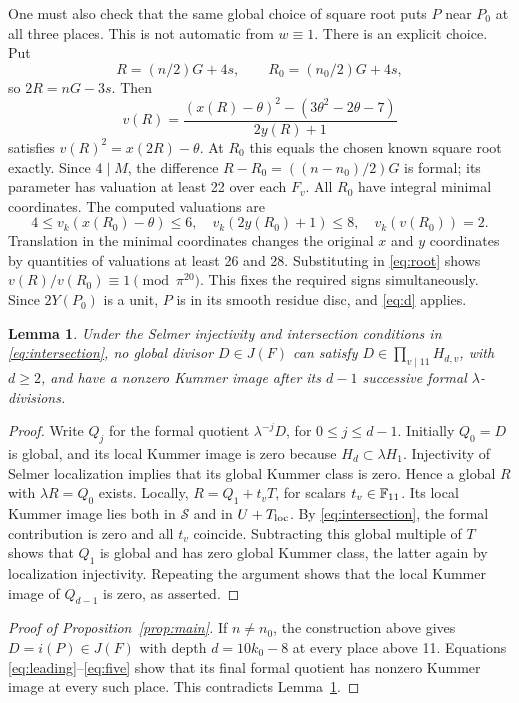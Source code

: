 \documentclass[11pt]{article}
\newtheorem{lemma}[proposition]{Lemma}
\begin{document}
One must also check that the same global choice of square root puts
\(P\) near \(P_0\) at all three places. This is not automatic from
\(w\equiv1\). There is an explicit choice. Put
\[
 R=(n/2)G+4s,\qquad R_0=(n_0/2)G+4s,
\]
so \(2R=nG-3s\). Then
\begin{equation}\label{eq:root}
 v(R)=\frac{(x(R)-\theta)^2-(3\theta^2-2\theta-7)}{2y(R)+1}
\end{equation}
satisfies \(v(R)^2=x(2R)-\theta\). At \(R_0\) this equals the chosen
known square root exactly. Since \(4\mid M\), the difference
\(R-R_0=((n-n_0)/2)G\) is formal; its parameter has valuation at least
22 over each \(F_v\). All \(R_0\) have integral minimal coordinates.
The computed valuations are
\[
 4\le v_k(x(R_0)-\theta)\le6,\quad
 v_k(2y(R_0)+1)\le8,\quad v_k(v(R_0))=2.
\]
Translation in the minimal coordinates changes the original \(x\)
and \(y\) coordinates by quantities of valuations at least 26 and 28.
Substituting in \eqref{eq:root} shows
\(v(R)/v(R_0)\equiv1\pmod{\pi^{20}}\).
This fixes the required signs simultaneously. Since \(2Y(P_0)\) is
a unit, \(P\) is in its smooth residue disc, and \eqref{eq:d} applies.

\begin{lemma}\label{lem:global}
Under the Selmer injectivity and intersection conditions in
\eqref{eq:intersection}, no global divisor \(D\in J(F)\) can satisfy
\(D\in\prod_{v\mid11}H_{d,v}\), with \(d\ge2\), and have a nonzero
Kummer image after its \(d-1\) successive formal \(\lambda\)-divisions.
\end{lemma}
\begin{proof}
Write \(Q_j\) for the formal quotient \(\lambda^{-j}D\), for
\(0\le j\le d-1\). Initially \(Q_0=D\) is global, and its local
Kummer image is zero because \(H_d\subset\lambda H_1\).
Injectivity of Selmer localization implies that its global Kummer
class is zero. Hence a global \(R\) with \(\lambda R=Q_0\) exists.
Locally, \(R=Q_1+t_vT\), for scalars \(t_v\in\mathbb F_{11}\). Its local
Kummer image lies both in \(\mathcal S\) and in \(U+T_{\rm loc}\).
By \eqref{eq:intersection}, the formal contribution is zero and all
\(t_v\) coincide. Subtracting this global multiple of \(T\) shows
that \(Q_1\) is global and has zero global Kummer class, the latter
again by localization injectivity. Repeating the argument shows that
the local Kummer image of \(Q_{d-1}\) is zero, as asserted.
\end{proof}

\begin{proof}[Proof of Proposition~\ref{prop:main}]
If \(n\ne n_0\), the construction above gives \(D=i(P)\in J(F)\)
with depth \(d=10k_0-8\) at every place above 11.
Equations \eqref{eq:leading}--\eqref{eq:five} show that its final formal
quotient has nonzero Kummer image at every such place. This contradicts
Lemma~\ref{lem:global}.
\end{proof}
\end{document}
